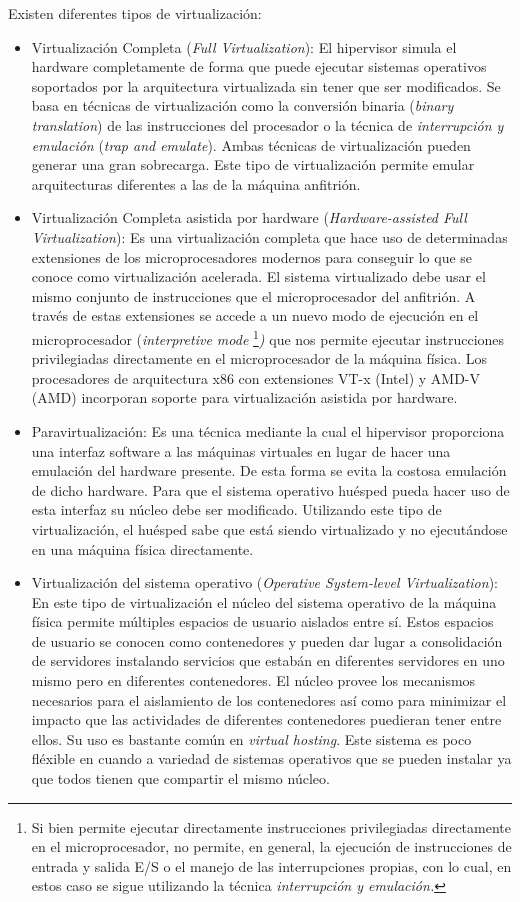 \documentclass[spanisheDIVcalc,twoside,parskip-,pointlessnumbers,final]{scrbook}
\begin{document}
Existen diferentes tipos de virtualización:
\begin{itemize}
\item Virtualización Completa (\emph{Full Virtualization}): El hipervisor
simula el hardware completamente de forma que puede ejecutar sistemas
operativos soportados por la arquitectura virtualizada sin tener que
ser modificados. Se basa en técnicas de virtualización como la conversión
binaria (\emph{binary translation}) de las instrucciones del procesador
o la técnica de \emph{interrupción y emulación }(\emph{trap and emulate}).
Ambas técnicas de virtualización pueden generar una gran sobrecarga.
Este tipo de virtualización permite emular arquitecturas diferentes
a las de la máquina anfitrión.
\item Virtualización Completa asistida por hardware (\emph{Hardware-assisted
Full Virtualization}): Es una virtualización completa que hace uso
de determinadas extensiones de los microprocesadores modernos para conseguir lo
que se conoce como virtualización acelerada. El sistema virtualizado
debe usar el mismo conjunto de instrucciones que el microprocesador del anfitrión.
A través de estas extensiones se accede a un nuevo modo de ejecución
en el microprocesador (\emph{interpretive mode}%
\footnote{Si bien permite ejecutar directamente instrucciones privilegiadas
directamente en el microprocesador, no permite, en general, la ejecución
de instrucciones de entrada y salida E/S o el manejo de las interrupciones
propias, con lo cual, en estos caso se sigue utilizando la técnica
\emph{interrupción y emulación.}%
}\emph{)} que nos permite ejecutar instrucciones privilegiadas directamente
en el microprocesador de la máquina física. Los procesadores de arquitectura
x86 con extensiones VT-x (Intel) y AMD-V (AMD) incorporan soporte
para virtualización asistida por hardware.
\item Paravirtualización: Es una técnica mediante la cual el hipervisor
proporciona una interfaz software a las máquinas virtuales en lugar
de hacer una emulación del hardware presente. De esta forma se evita
la costosa emulación de dicho hardware. Para que el sistema operativo
huésped pueda hacer uso de esta interfaz su núcleo debe ser modificado.
Utilizando este tipo de virtualización, el huésped sabe que está siendo
virtualizado y no ejecutándose en una máquina física directamente. 
\item Virtualización del sistema operativo (\emph{Operative System-level
Virtualization}): En este tipo de virtualización el núcleo del sistema
operativo de la máquina física permite múltiples espacios de usuario
aislados entre sí. Estos espacios de usuario se conocen como contenedores
y pueden dar lugar a consolidación de servidores instalando servicios
que estabán en diferentes servidores en uno mismo pero en diferentes
contenedores. El núcleo provee los mecanismos necesarios para el aislamiento
de los contenedores así como para minimizar el impacto que las actividades
de diferentes contenedores puedieran tener entre ellos. Su uso es
bastante común en \emph{virtual hosting}. Este sistema es poco fléxible
en cuando a variedad de sistemas operativos que se pueden instalar
ya que todos tienen que compartir el mismo núcleo.
\end{itemize}
\end{document}
